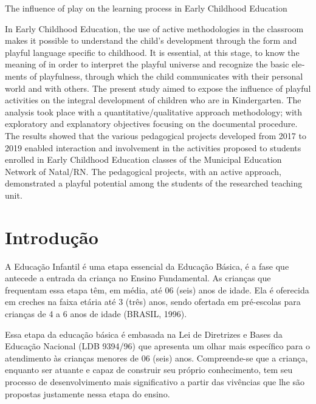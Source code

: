 \begin{refsection}
    
    \begin{otherlanguage}{english}

    \fakeChapterOneLine
    {The influence of play on the learning process in Early Childhood Education}

    \begin{galoResumo}[Abstract]
        In Early Childhood Education, the use of active methodologies in the classroom makes it possible to understand the child's development through the form and playful language specific to childhood. It is essential, at this stage, to know the meaning of in order to interpret the playful universe and recognize the basic elements of playfulness, through which the child communicates with their personal world and with others. The present study aimed to expose the influence of playful activities on the integral development of children who are in Kindergarten. The analysis took place with a quantitative/qualitative approach methodology; with exploratory and explanatory objectives focusing on the documental procedure. The results showed that the various pedagogical projects developed from 2017 to 2019 enabled interaction and involvement in the activities proposed to students enrolled in Early Childhood Education classes of the Municipal Education Network of Natal/RN. The pedagogical projects, with an active approach, demonstrated a playful potential among the students of the researched teaching unit. 
    \end{galoResumo}
    
    \end{otherlanguage}


    \section{Introdução}

    A Educação Infantil é uma etapa essencial da Educação Básica, é a fase que antecede a entrada da criança no Ensino Fundamental. As crianças que frequentam essa etapa têm, em média, até 06 (seis) anos de idade. Ela é oferecida em creches na faixa etária até 3 (três) anos, sendo ofertada em pré-escolas para crianças de 4 a 6 anos de idade (BRASIL, 1996).  

    Essa etapa da educação básica é embasada na Lei de Diretrizes e Bases da Educação Nacional (LDB 9394/96) que apresenta um olhar mais específico para o atendimento às crianças menores de 06 (seis) anos. Compreende-se que a criança, enquanto ser atuante e capaz de construir seu próprio conhecimento, tem seu processo de desenvolvimento mais significativo a partir das vivências que lhe são propostas justamente nessa etapa do ensino. 


\end{refsection}
